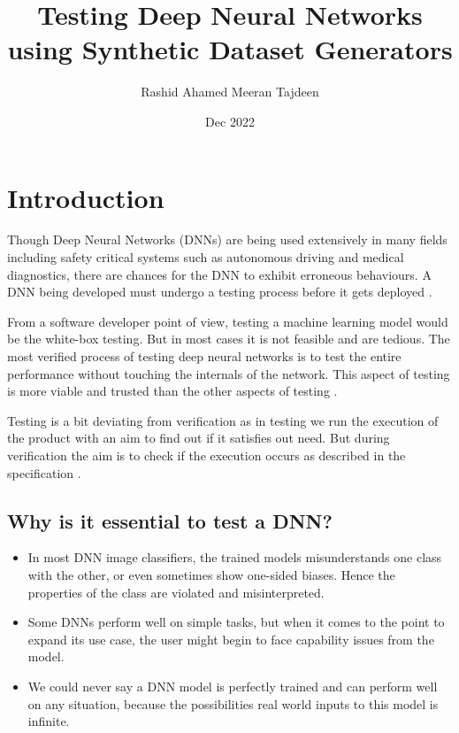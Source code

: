 \documentclass[rnd]{mas_proposal}
\title{Testing Deep Neural Networks using Synthetic Dataset Generators}
\author{Rashid Ahamed Meeran Tajdeen}
\date{Dec 2022}
\begin{document}
\maketitle

\pagestyle{plain}

\section{Introduction}
    
Though Deep Neural Networks (DNNs) are being used extensively in many fields including safety critical systems such as autonomous driving and medical diagnostics, there are chances for the DNN to exhibit erroneous behaviours. A DNN being developed must undergo a testing process before it gets deployed \cite{DBLP:journals/corr/abs-2112-12591}.

From a software developer point of view, testing a machine learning model would be the white-box testing. But in most cases it is not feasible and are tedious. The most verified process of testing deep neural networks is to test the entire performance without touching the internals of the network. This aspect of testing is more viable and trusted than the other aspects of testing \cite{DBLP:journals/corr/abs-2112-12591}.

Testing is a bit deviating from verification as in testing we run the execution of the product with an aim to find out if it satisfies out need. But during verification the aim is to check if the execution occurs as described in the specification \cite{verification}.
    
\subsection{Why is it essential to test a DNN?}
    
\begin{itemize}
    \item In most DNN image classifiers, the trained models misunderstands one class with the other, or even sometimes show one-sided biases. Hence the properties of the class are violated and misinterpreted.
    \item Some DNNs perform well on simple tasks, but when it comes to the point to expand its use case, the user might begin to face capability issues from the model.
    \item We could never say a DNN model is perfectly trained and can perform well on any situation, because the possibilities real world inputs to this model is infinite.
\end{itemize}
    
\end{document}
